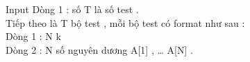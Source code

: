 Input
Dòng 1 : số T là số test .   
\\   Tiếp theo là T bộ test , mỗi bộ test có format như sau :   
\\   Dòng 1 : N k   
\\   Dòng 2 : N số nguyên dương A[1] , … A[N] .   
\\
